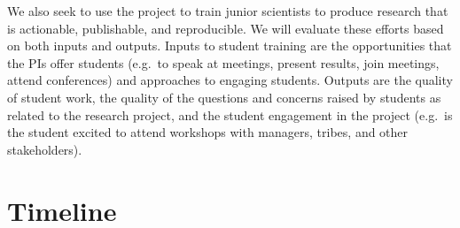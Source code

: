We also seek to use the project to train junior scientists to produce research that is actionable, publishable, and reproducible. We will evaluate these efforts based on both inputs and outputs. Inputs to student training are the opportunities that the PIs offer students (e.g.\ to speak at meetings, present results, join meetings, attend conferences) and approaches to engaging students. Outputs are the quality of student work, the quality of the questions and concerns raised by students as related to the research project, and the student engagement in the project (e.g.\ is the student excited to attend workshops with managers, tribes, and other stakeholders). 

\section{Timeline}
